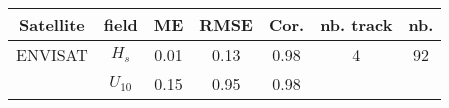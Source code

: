 \begin{center}
\begin{tabular}{|c|c|c|c|c|c|c|}
\hline
Satellite & field & ME & RMSE & Cor. & nb. track & nb.\\
\hline
ENVISAT & $H_s$    & 0.01 & 0.13 & 0.98 & 4 & 92\\
        & $U_{10}$ & 0.15 & 0.95 & 0.98 &    &   \\
\hline
\end{tabular}
\end{center}
